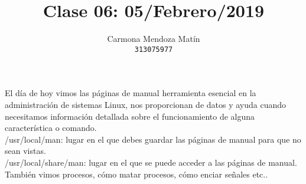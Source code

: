 \documentclass[11pt, a4paper]{report}
\begin{document}
\title{Clase 06: 05/Febrero/2019}
\author{
  Carmona Mendoza Mat\'in\\
  \texttt{313075977}
}
\date{}
\maketitle

El d\'ia de hoy vimos las p\'aginas de manual herramienta esencial en la administración de 
sistemas Linux, nos proporcionan de datos y ayuda cuando necesitamos informaci\'on detallada 
sobre el funcionamiento de alguna caracter\'istica o comando. \\

/usr/local/man: lugar en el que debes guardar las p\'aginas de manual para que no sean vistas.\\
/usr/local/share/man: lugar en el que se puede acceder a las p\'aginas de manual. \\

Tambi\'en vimos procesos, c\'omo matar procesos, c\'omo enciar señales etc.. 
  
\end{document}
